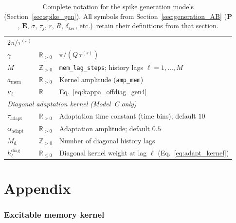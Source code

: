 \documentclass[11pt]{article}
\begin{document}
\begin{table}[h]
\begin{tabular}{lll}
  $2\pi/\tau^{(s)}$ \\
$\gamma$ & $\mathbb{R}_{>0}$ &
  $\pi/(Q\,\tau^{(s)})$ \\
$M$    & $\mathbb{Z}_{>0}$ &
  \texttt{mem\_lag\_steps}; history lags $\ell=1,\dots,M$ \\
$a_{\mathrm{mem}}$ & $\mathbb{R}_{>0}$ &
  Kernel amplitude (\texttt{amp\_mem}) \\
$\kappa_\ell$ & $\mathbb{R}$ &
  Eq.~\ref{eq:kappa_offdiag_gen4} \\
\midrule
\multicolumn{3}{l}{\textit{Diagonal adaptation kernel
  (Model~C only)}} \\
$\tau_{\mathrm{adapt}}$ & $\mathbb{R}_{>0}$ &
  Adaptation time constant (time bins); default $10$ \\
$\alpha_{\mathrm{adapt}}$ & $\mathbb{R}_{>0}$ &
  Adaptation amplitude; default $0.5$ \\
$M_{\mathrm{d}}$ & $\mathbb{Z}_{>0}$ &
  Number of diagonal history lags \\
$h^{\mathrm{diag}}_\ell$ & $\mathbb{R}_{\leq 0}$ & 
  Diagonal kernel weight at lag $\ell$
  (Eq.~\ref{eq:adapt_kernel}) \\
\bottomrule
\end{tabular}
\endgroup
\caption{Complete notation for the spike generation models
  (Section~\ref{sec:spike_gen}).
  All symbols from Section~\ref{sec:generation_AB}
  ($\mathbf{P}$, $\mathbf{E}$, $\sigma$, $\tau_j$, $r$, $R$,
  $\delta_{\mathrm{ker}}$, etc.)\ retain their definitions
  from that section.}
\label{tab:notation}
\end{table}

\appendix
\section*{\Huge Appendix}
\vspace{1cm}

\subsubsection{Excitable memory kernel}
\end{document}
